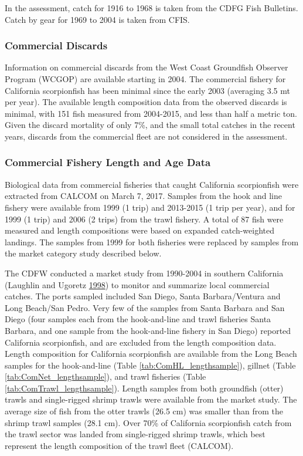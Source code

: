 \documentclass[12pt,]{article}
\begin{document}
In the assessment, catch for 1916 to 1968 is taken from the CDFG Fish
Bulletins. Catch by gear for 1969 to 2004 is taken from CFIS.

\subsubsection{Commercial Discards}\label{commercial-discards}

Information on commercial discards from the West Coast Groundfish
Observer Program (WCGOP) are available starting in 2004. The commercial
fishery for California scorpionfish has been minimal since the early
2003 (averaging 3.5 mt per year). The available length composition data
from the observed discards is minimal, with 151 fish measured from
2004-2015, and less than half a metric ton. Given the discard mortality
of only 7\%, and the small total catches in the recent years, discards
from the commercial fleet are not considered in the assessment.

\subsubsection{Commercial Fishery Length and Age
Data}\label{commercial-fishery-length-and-age-data}

Biological data from commercial fisheries that caught California
scorpionfish were extracted from CALCOM on March 7, 2017. Samples from
the hook and line fishery were available from 1999 (1 trip) and
2013-2015 (1 trip per year), and for 1999 (1 trip) and 2006 (2 trips)
from the trawl fishery. A total of 87 fish were measured and length
compositions were based on expanded catch-weighted landings. The samples
from 1999 for both fisheries were replaced by samples from the market
category study described below.

The CDFW conducted a market study from 1990-2004 in southern California
(Laughlin and Ugoretz \protect\hyperlink{ref-Laughlin1998}{1998}) to
monitor and summarize local commercial catches. The ports sampled
included San Diego, Santa Barbara/Ventura and Long Beach/San Pedro. Very
few of the samples from Santa Barbara and San Diego (four samples each
from the hook-and-line and trawl fisheries Santa Barbara, and one sample
from the hook-and-line fishery in San Diego) reported California
scorpionfish, and are excluded from the length composition data. Length
composition for California scorpionfish are available from the Long
Beach samples for the hook-and-line (Table
\ref{tab:ComHL_lengthsample}), gillnet (Table
\ref{tab:ComNet_lengthsample}), and trawl fisheries (Table
\ref{tab:ComTrawl_lengthsample}). Length samples from both groundfish
(otter) trawls and single-rigged shrimp trawls were available from the
market study. The average size of fish from the otter trawls (26.5 cm)
was smaller than from the shrimp trawl samples (28.1 cm). Over 70\% of
California scorpionfish catch from the trawl sector was landed from
single-rigged shrimp trawls, which best represent the length composition
of the trawl fleet (CALCOM).
\end{document}
